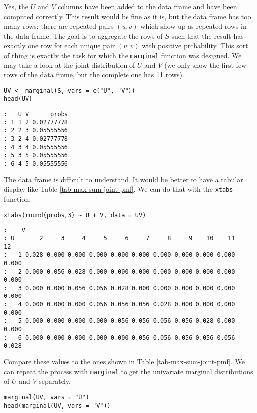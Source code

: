 Yes, the \(U\) and \(V\) columns have been added to the data frame and
have been computed correctly. This result would be fine as it is, but
the data frame has too many rows: there are repeated pairs \((u,v)\)
which show up as repeated rows in the data frame. The goal is to
aggregate the rows of \(S\) such that the result has exactly one row
for each unique pair \((u,v)\) with positive probability. This sort of
thing is exactly the task for which the \texttt{marginal} function was
designed. We may take a look at the joint distribution of \(U\) and
\(V\) (we only show the first few rows of the data frame, but the
complete one has 11 rows).

\begin{verbatim}
UV <- marginal(S, vars = c("U", "V"))
head(UV)
\end{verbatim}

\begin{verbatim}
:   U V      probs
: 1 1 2 0.02777778
: 2 2 3 0.05555556
: 3 2 4 0.02777778
: 4 3 4 0.05555556
: 5 3 5 0.05555556
: 6 4 5 0.05555556
\end{verbatim}

The data frame is difficult to understand. It would be better to have
a tabular display like Table \ref{tab-max-sum-joint-pmf}. We can do that with
the \texttt{xtabs} function.

\begin{verbatim}
xtabs(round(probs,3) ~ U + V, data = UV)
\end{verbatim}

\begin{verbatim}
:    V
: U       2     3     4     5     6     7     8     9    10    11    12
:   1 0.028 0.000 0.000 0.000 0.000 0.000 0.000 0.000 0.000 0.000 0.000
:   2 0.000 0.056 0.028 0.000 0.000 0.000 0.000 0.000 0.000 0.000 0.000
:   3 0.000 0.000 0.056 0.056 0.028 0.000 0.000 0.000 0.000 0.000 0.000
:   4 0.000 0.000 0.000 0.056 0.056 0.056 0.028 0.000 0.000 0.000 0.000
:   5 0.000 0.000 0.000 0.000 0.056 0.056 0.056 0.056 0.028 0.000 0.000
:   6 0.000 0.000 0.000 0.000 0.000 0.056 0.056 0.056 0.056 0.056 0.028
\end{verbatim}

Compare these values to the ones shown in Table \ref{tab-max-sum-joint-pmf}. We
can repeat the process with \texttt{marginal} to get the univariate marginal
distributions of \(U\) and \(V\) separately.

\begin{verbatim}
marginal(UV, vars = "U")
head(marginal(UV, vars = "V"))
\end{verbatim}


